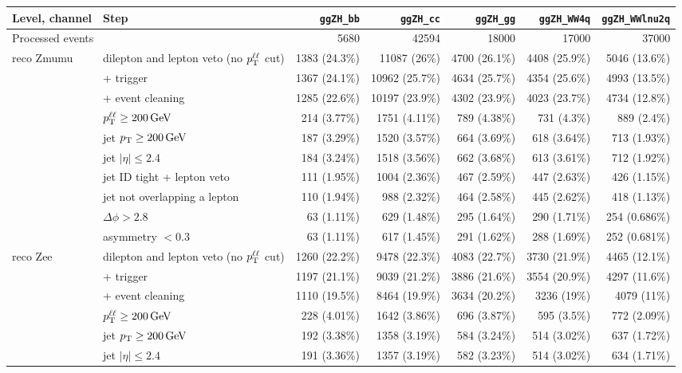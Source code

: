 \begin{tabular}{llrrrrr}
\toprule
Level, channel & Step & \texttt{ggZH\_bb} & \texttt{ggZH\_cc} & \texttt{ggZH\_gg} & \texttt{ggZH\_WW4q} & \texttt{ggZH\_WWlnu2q} \\
\midrule
\multicolumn{2}{l}{Processed events} & 5680 & 42594 & 18000 & 17000 & 37000 \\
\midrule
reco Zmumu & dilepton and lepton veto (no $p_{\mathrm{T}}^{\ell\ell}$ cut) & 1383 (24.3\%) & 11087 (26\%) & 4700 (26.1\%) & 4408 (25.9\%) & 5046 (13.6\%) \\
 & + trigger & 1367 (24.1\%) & 10962 (25.7\%) & 4634 (25.7\%) & 4354 (25.6\%) & 4993 (13.5\%) \\
 & + event cleaning & 1285 (22.6\%) & 10197 (23.9\%) & 4302 (23.9\%) & 4023 (23.7\%) & 4734 (12.8\%) \\
 & $p_{\mathrm{T}}^{\ell\ell} \geq 200\,\mathrm{GeV}$ & 214 (3.77\%) & 1751 (4.11\%) & 789 (4.38\%) & 731 (4.3\%) & 889 (2.4\%) \\
 & jet $p_{\mathrm{T}} \geq 200\,\mathrm{GeV}$ & 187 (3.29\%) & 1520 (3.57\%) & 664 (3.69\%) & 618 (3.64\%) & 713 (1.93\%) \\
 & jet $|\eta| \leq 2.4$ & 184 (3.24\%) & 1518 (3.56\%) & 662 (3.68\%) & 613 (3.61\%) & 712 (1.92\%) \\
 & jet ID tight + lepton veto & 111 (1.95\%) & 1004 (2.36\%) & 467 (2.59\%) & 447 (2.63\%) & 426 (1.15\%) \\
 & jet not overlapping a lepton & 110 (1.94\%) & 988 (2.32\%) & 464 (2.58\%) & 445 (2.62\%) & 418 (1.13\%) \\
 & $\Delta\phi > 2.8$ & 63 (1.11\%) & 629 (1.48\%) & 295 (1.64\%) & 290 (1.71\%) & 254 (0.686\%) \\
 & asymmetry $< 0.3$ & 63 (1.11\%) & 617 (1.45\%) & 291 (1.62\%) & 288 (1.69\%) & 252 (0.681\%) \\
\midrule
reco Zee & dilepton and lepton veto (no $p_{\mathrm{T}}^{\ell\ell}$ cut) & 1260 (22.2\%) & 9478 (22.3\%) & 4083 (22.7\%) & 3730 (21.9\%) & 4465 (12.1\%) \\
 & + trigger & 1197 (21.1\%) & 9039 (21.2\%) & 3886 (21.6\%) & 3554 (20.9\%) & 4297 (11.6\%) \\
 & + event cleaning & 1110 (19.5\%) & 8464 (19.9\%) & 3634 (20.2\%) & 3236 (19\%) & 4079 (11\%) \\
 & $p_{\mathrm{T}}^{\ell\ell} \geq 200\,\mathrm{GeV}$ & 228 (4.01\%) & 1642 (3.86\%) & 696 (3.87\%) & 595 (3.5\%) & 772 (2.09\%) \\
 & jet $p_{\mathrm{T}} \geq 200\,\mathrm{GeV}$ & 192 (3.38\%) & 1358 (3.19\%) & 584 (3.24\%) & 514 (3.02\%) & 637 (1.72\%) \\
 & jet $|\eta| \leq 2.4$ & 191 (3.36\%) & 1357 (3.19\%) & 582 (3.23\%) & 514 (3.02\%) & 634 (1.71\%) \\

\end{tabular}
